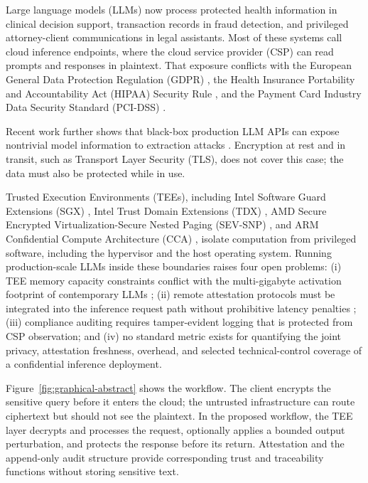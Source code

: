 \documentclass{ieeeaccess}
\begin{document}
Large language models (LLMs) now process protected health information in
clinical decision support, transaction records in fraud detection, and
privileged attorney-client communications in legal assistants. Most of these
systems call cloud inference endpoints, where the cloud service provider (CSP)
can read prompts and responses in plaintext. That exposure conflicts with the
European General Data Protection Regulation (GDPR) \cite{gdpr2016}, the
Health Insurance Portability and Accountability Act (HIPAA) Security Rule
\cite{hipaa1996}, and the Payment Card Industry Data Security Standard
(PCI-DSS) \cite{pcidss2022}.

Recent work further shows that black-box production LLM APIs can expose
nontrivial model information to extraction attacks \cite{carlini2024stealing}.
Encryption at rest and in transit, such as Transport Layer Security (TLS), does not cover this case; the data must
also be protected while in use.

Trusted Execution Environments (TEEs), including Intel Software Guard
Extensions (SGX) \cite{mckeen2013innovative}, Intel Trust Domain Extensions
(TDX) \cite{inteltdx2023}, AMD Secure Encrypted Virtualization-Secure Nested
Paging (SEV-SNP) \cite{amdsev2020}, and ARM Confidential Compute Architecture
(CCA) \cite{armcca2022}, isolate computation from privileged software,
including the hypervisor and the host operating system. Running
production-scale LLMs inside these boundaries raises four open problems: (i) TEE memory
capacity constraints conflict with the multi-gigabyte activation footprint of
contemporary LLMs \cite{tramer2019slalom}; (ii) remote attestation
protocols must be integrated into the inference request path without
prohibitive latency penalties \cite{anati2013innovative}; (iii) compliance
auditing requires tamper-evident logging that is protected from
CSP observation; and (iv) no standard metric exists for quantifying the joint
privacy, attestation freshness, overhead, and selected technical-control
coverage of a confidential inference deployment.

Figure~\ref{fig:graphical-abstract} shows the workflow. The client encrypts the sensitive query before it enters the cloud;
the untrusted infrastructure can route ciphertext but should not see the
plaintext. In the proposed workflow, the TEE layer decrypts and processes the
request, optionally applies a bounded output perturbation, and protects the
response before its return. Attestation and the append-only audit structure
provide corresponding trust and traceability functions without storing sensitive text.
\end{document}
